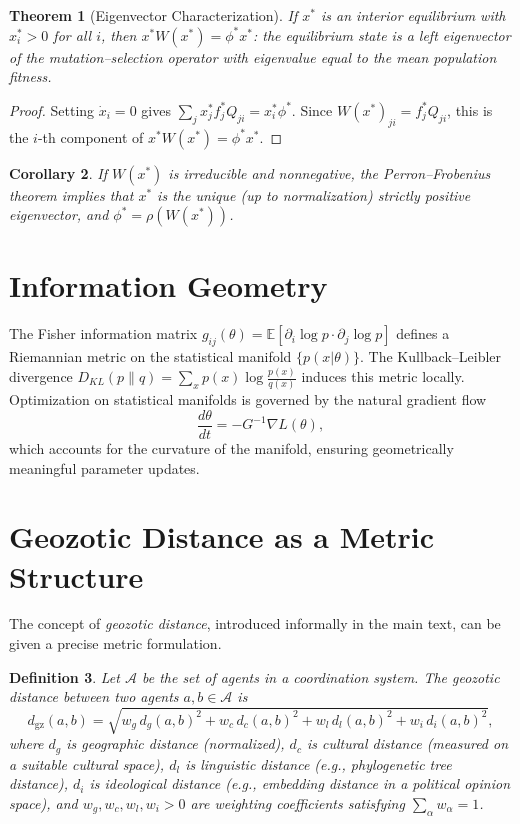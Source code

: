 \documentclass[12pt]{article}
\newtheorem{theorem}{Theorem}[section]
\newtheorem{corollary}[theorem]{Corollary}
\newtheorem{definition}[theorem]{Definition}
\begin{document}
\begin{theorem}[Eigenvector Characterization]
If $x^*$ is an interior equilibrium with $x_i^* > 0$ for all $i$, then $x^* W(x^*) = \phi^* x^*$: the equilibrium state is a left eigenvector of the mutation--selection operator with eigenvalue equal to the mean population fitness.
\end{theorem}

\begin{proof}
Setting $\dot{x}_i = 0$ gives $\sum_j x_j^* f_j^* Q_{ji} = x_i^* \phi^*$. Since $W(x^*)_{ji} = f_j^* Q_{ji}$, this is the $i$-th component of $x^* W(x^*) = \phi^* x^*$.
\end{proof}

\begin{corollary}
If $W(x^*)$ is irreducible and nonnegative, the Perron--Frobenius theorem implies that $x^*$ is the unique (up to normalization) strictly positive eigenvector, and $\phi^* = \rho(W(x^*))$.
\end{corollary}

\section{Information Geometry}

The Fisher information matrix $g_{ij}(\theta) = \mathbb{E}[\partial_i \log p \cdot \partial_j \log p]$ defines a Riemannian metric on the statistical manifold $\{p(x|\theta)\}$. The Kullback--Leibler divergence $D_{KL}(p\|q) = \sum_x p(x)\log\tfrac{p(x)}{q(x)}$ induces this metric locally. Optimization on statistical manifolds is governed by the natural gradient flow
\[
\frac{d\theta}{dt} = -G^{-1}\nabla L(\theta),
\]
which accounts for the curvature of the manifold, ensuring geometrically meaningful parameter updates.

\section{Geozotic Distance as a Metric Structure}
\label{app:geozotic}

The concept of \emph{geozotic distance}, introduced informally in the main text, can be given a precise metric formulation.

\begin{definition}
Let $\mathcal{A}$ be the set of agents in a coordination system. The geozotic distance between two agents $a, b \in \mathcal{A}$ is
\[
d_{\mathrm{gz}}(a,b) = \sqrt{w_g\, d_g(a,b)^2 + w_c\, d_c(a,b)^2 + w_l\, d_l(a,b)^2 + w_i\, d_i(a,b)^2},
\]
where $d_g$ is geographic distance (normalized), $d_c$ is cultural distance (measured on a suitable cultural space), $d_l$ is linguistic distance (e.g., phylogenetic tree distance), $d_i$ is ideological distance (e.g., embedding distance in a political opinion space), and $w_g, w_c, w_l, w_i > 0$ are weighting coefficients satisfying $\sum_\alpha w_\alpha = 1$.
\end{definition}
\end{document}
